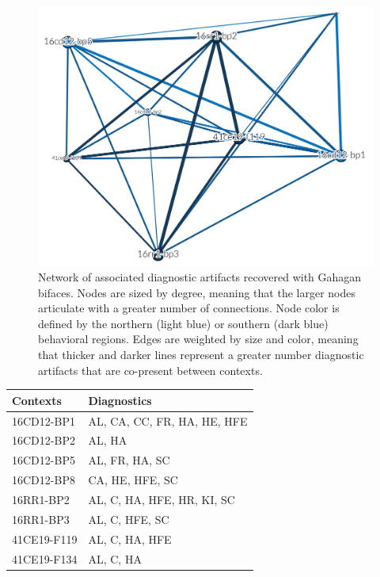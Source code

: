 \documentclass[]{interact}
\theoremstyle{plain}%
\theoremstyle{definition}
\theoremstyle{remark}
\begin{document}
\begin{figure}

{\centering \includegraphics[width=0.7\linewidth]{img/fig04} 

}

\caption{Network of associated diagnostic artifacts recovered with Gahagan bifaces. Nodes are sized by degree, meaning that the larger nodes articulate with a greater number of connections. Node color is defined by the northern (light blue) or southern (dark blue) behavioral regions. Edges are weighted by size and color, meaning that thicker and darker lines represent a greater number diagnostic artifacts that are co-present between contexts.}\label{fig:associated.net}
\end{figure}

\begin{table}
{\begin{tabular}{ll} \toprule
Contexts & Diagnostics \\
\midrule
16CD12-BP1 & AL, CA, CC, FR, HA, HE, HFE \\
16CD12-BP2 & AL, HA \\
16CD12-BP5 & AL, FR, HA, SC \\
16CD12-BP8 & CA, HE, HFE, SC \\
16RR1-BP2 & AL, C, HA, HFE, HR, KI, SC \\
16RR1-BP3 & AL, C, HFE, SC \\
41CE19-F119 & AL, C, HA, HFE \\
41CE19-F134 & AL, C, HA \\
\bottomrule
\end{tabular}}
\label{sample-table}
\end{table}
\end{document}
